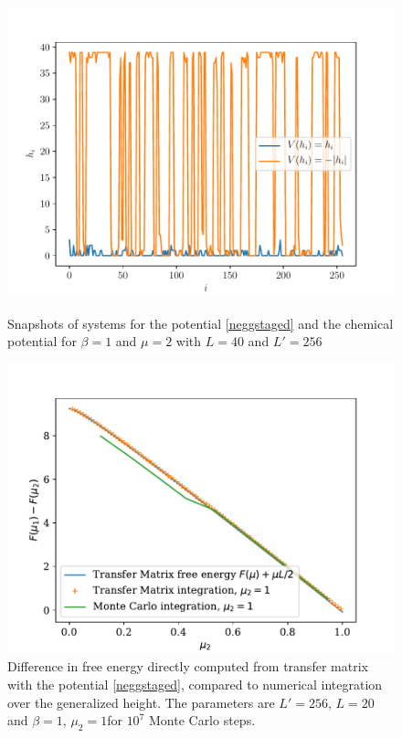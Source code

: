 \begin{figure}
    \centering
	\includegraphics[width=0.7\linewidth]{int-dyn/comp-potentiels-chimiques.pdf}
	\caption{Snapshots of systems for the potential \eqref{neggstaged} and the chemical potential for $\beta=1$ and $\mu=2$ with $L=40$ and $L'=256$}
    \label{fig-negstagged}	
    \centering
   	\includegraphics[width=0.7\linewidth]{int-dyn/integration-free-ene-negstagged.pdf}
    \caption{Difference in free energy directly computed from transfer matrix with the potential \eqref{neggstaged}, compared to numerical integration over the generalized height. The parameters are $L' = 256$, $L=20$ and $\beta=1$, $\mu_2 = 1$for $10^7$ Monte Carlo steps. } 
   	\label{fig-int-negstagged}    
\end{figure}  

